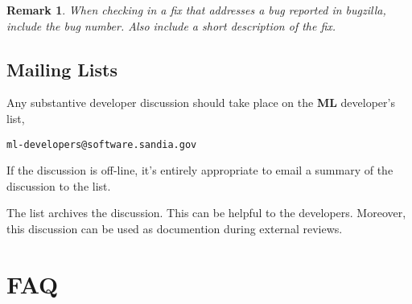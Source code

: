 \documentclass[10pt,letter,relax]{SANDreport}
\newtheorem{remark}{Remark}
\newcommand{\ML}     {{\bf ML }}
\begin{document}
\begin{remark}
  When checking in a fix that addresses a bug reported in bugzilla,
  include the bug number.  Also include a short description of the fix.
\end{remark}

\subsection{Mailing Lists}

Any substantive developer discussion should take place on the \ML
developer's list, 
\begin{verbatim}
ml-developers@software.sandia.gov
\end{verbatim}
If the discussion is off-line, it's entirely appropriate to email a
summary of the discussion to the list.

The list archives the discussion.  This can be helpful to the
developers.  Moreover, this discussion can be used as documention during
external reviews.


\section{FAQ}
\label{sec:faq}
\end{document}

